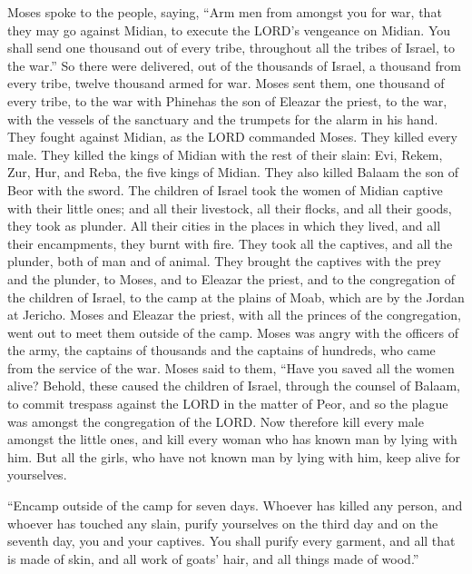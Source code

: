  Moses spoke to the people, saying, ``Arm men from amongst
you for war, that they may go against Midian, to execute the LORD's
vengeance on Midian.  You shall send one thousand out of
every tribe, throughout all the tribes of Israel, to the war.''
 So there were delivered, out of the thousands of Israel,
a thousand from every tribe, twelve thousand armed for war.
 Moses sent them, one thousand of every tribe, to the war
with Phinehas the son of Eleazar the priest, to the war, with the
vessels of the sanctuary and the trumpets for the alarm in his hand.
 They fought against Midian, as the LORD commanded Moses.
They killed every male.  They killed the kings of Midian
with the rest of their slain: Evi, Rekem, Zur, Hur, and Reba, the five
kings of Midian. They also killed Balaam the son of Beor with the sword.
 The children of Israel took the women of Midian captive
with their little ones; and all their livestock, all their flocks, and
all their goods, they took as plunder.  All their cities
in the places in which they lived, and all their encampments, they burnt
with fire.  They took all the captives, and all the
plunder, both of man and of animal.  They brought the
captives with the prey and the plunder, to Moses, and to Eleazar the
priest, and to the congregation of the children of Israel, to the camp
at the plains of Moab, which are by the Jordan at Jericho.
 Moses and Eleazar the priest, with all the princes of
the congregation, went out to meet them outside of the camp.
 Moses was angry with the officers of the army, the
captains of thousands and the captains of hundreds, who came from the
service of the war.  Moses said to them, ``Have you saved
all the women alive?  Behold, these caused the children
of Israel, through the counsel of Balaam, to commit trespass against the
LORD in the matter of Peor, and so the plague was amongst the
congregation of the LORD.  Now therefore kill every male
amongst the little ones, and kill every woman who has known man by lying
with him.  But all the girls, who have not known man by
lying with him, keep alive for yourselves.

 ``Encamp outside of the camp for seven days. Whoever has
killed any person, and whoever has touched any slain, purify yourselves
on the third day and on the seventh day, you and your captives.
 You shall purify every garment, and all that is made of
skin, and all work of goats' hair, and all things made of wood.''

